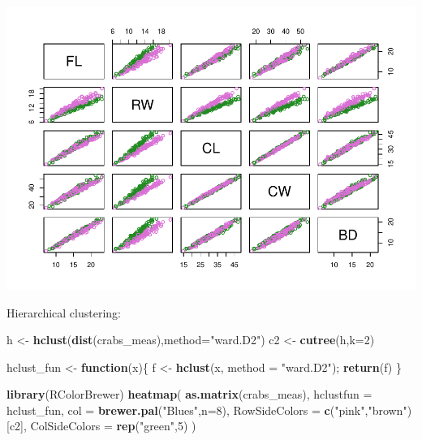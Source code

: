 \documentclass[
]{book}
\newenvironment{Shaded}{\begin{snugshade}}{\end{snugshade}}
\newcommand{\AttributeTok}[1]{\textcolor[rgb]{0.13,0.29,0.53}{#1}}
\newcommand{\ControlFlowTok}[1]{\textcolor[rgb]{0.13,0.29,0.53}{\textbf{#1}}}
\newcommand{\DecValTok}[1]{\textcolor[rgb]{0.00,0.00,0.81}{#1}}
\newcommand{\FunctionTok}[1]{\textcolor[rgb]{0.13,0.29,0.53}{\textbf{#1}}}
\newcommand{\NormalTok}[1]{#1}
\newcommand{\OtherTok}[1]{\textcolor[rgb]{0.56,0.35,0.01}{#1}}
\newcommand{\StringTok}[1]{\textcolor[rgb]{0.31,0.60,0.02}{#1}}
\begin{document}
\includegraphics{_main_files/figure-latex/unnamed-chunk-32-3.pdf}

Hierarchical clustering:

\begin{Shaded}
\begin{Highlighting}[]
\NormalTok{h }\OtherTok{\textless{}{-}} \FunctionTok{hclust}\NormalTok{(}\FunctionTok{dist}\NormalTok{(crabs\_meas),}\AttributeTok{method=}\StringTok{"ward.D2"}\NormalTok{)}
\NormalTok{c2 }\OtherTok{\textless{}{-}} \FunctionTok{cutree}\NormalTok{(h,}\AttributeTok{k=}\DecValTok{2}\NormalTok{)}

\NormalTok{hclust\_fun }\OtherTok{\textless{}{-}} \ControlFlowTok{function}\NormalTok{(x)\{}
\NormalTok{    f }\OtherTok{\textless{}{-}} \FunctionTok{hclust}\NormalTok{(x, }\AttributeTok{method =} \StringTok{"ward.D2"}\NormalTok{);}
    \FunctionTok{return}\NormalTok{(f)}
\NormalTok{\}}

\FunctionTok{library}\NormalTok{(RColorBrewer)}
\FunctionTok{heatmap}\NormalTok{(}
    \FunctionTok{as.matrix}\NormalTok{(crabs\_meas),}
    \AttributeTok{hclustfun =}\NormalTok{ hclust\_fun,}
    \AttributeTok{col =} \FunctionTok{brewer.pal}\NormalTok{(}\StringTok{"Blues"}\NormalTok{,}\AttributeTok{n=}\DecValTok{8}\NormalTok{),}
    \AttributeTok{RowSideColors =} \FunctionTok{c}\NormalTok{(}\StringTok{"pink"}\NormalTok{,}\StringTok{"brown"}\NormalTok{)[c2], }
    \AttributeTok{ColSideColors =} \FunctionTok{rep}\NormalTok{(}\StringTok{"green"}\NormalTok{,}\DecValTok{5}\NormalTok{)}
\NormalTok{)}
\end{Highlighting}
\end{Shaded}
\end{document}
